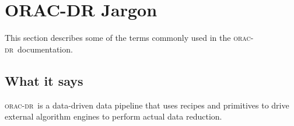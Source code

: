 \documentclass[twoside,11pt]{article}
\renewcommand{\_}{\texttt{\symbol{95}}}
\newcommand{\oracdr}{\textsc{orac-dr}}
\begin{document}
\section{ORAC-DR Jargon\label{ORAC-DR_Jargon}}

This section describes some of the terms commonly used in
the \oracdr\ documentation.

\subsection*{What it says\label{ORAC-DR_What_it_says}}

\oracdr\ is a data-driven data pipeline that uses recipes and
primitives to drive external algorithm engines to perform actual data
reduction.
\end{document}
